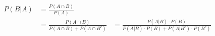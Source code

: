 \begin{align*}
P(B|A) &= \frac{P(A \cap B)}{P(A)}\\
&= \frac{P(A \cap B)}{P(A \cap B) + P(A \cap B^c)}
&= \frac{P(A|B) \cdot P(B)}{P(A|B) \cdot P(B) + P(A|B^c) \cdot P(B^c)}
\end{align*}
